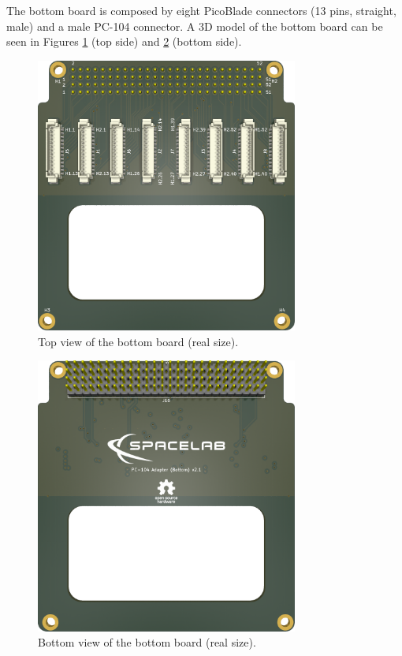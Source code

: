 The bottom board is composed by eight PicoBlade connectors (13 pins, straight, male) and a male PC-104 connector. A 3D model of the bottom board can be seen in Figures \ref{fig:bottom-board-top} (top side) and \ref{fig:bottom-board-bottom} (bottom side).

\begin{figure}[!htb]
    \begin{center}
        \includegraphics[width=8.626cm]{figures/pc104-adapter-bottom-top}
        \caption{Top view of the bottom board (real size).}
        \label{fig:bottom-board-top}
    \end{center}
\end{figure}

\begin{figure}[!htb]
    \begin{center}
        \includegraphics[width=8.626cm]{figures/pc104-adapter-bottom-bottom}
        \caption{Bottom view of the bottom board (real size).}
        \label{fig:bottom-board-bottom}
    \end{center}
\end{figure}

